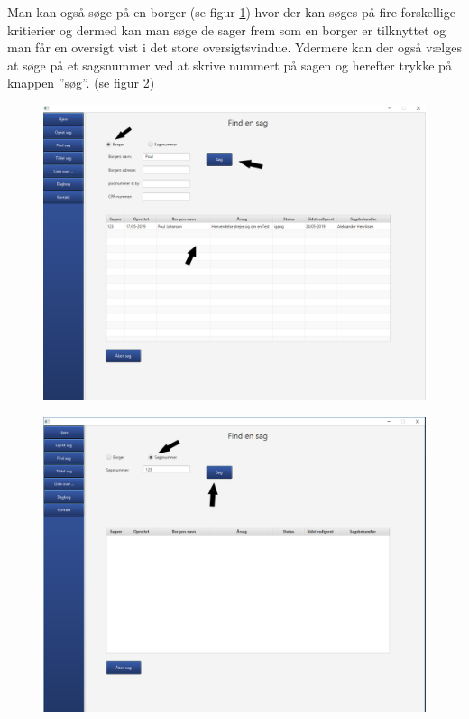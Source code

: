 Man kan også søge på en borger (se figur \ref{bru:f9}) hvor der kan søges på fire forskellige kritierier og dermed kan man søge de sager frem som en borger er tilknyttet og man får en oversigt vist i det store oversigtsvindue. Ydermere kan der også vælges at søge på et sagsnummer ved at skrive nummert på sagen og herefter trykke på knappen ”søg”. (se figur \ref{bru:f10}) 
\begin{figure}[htb!]
  \includegraphics[scale = 0.3]{./PNG/brugervejledning/figur9.PNG} 
  \caption{}  
  \label{bru:f9}
\end{figure}
\begin{figure}[htb!]
  \includegraphics[scale = 0.3]{./PNG/brugervejledning/figur10.PNG} 
  \caption{}  
  \label{bru:f10}
\end{figure}
